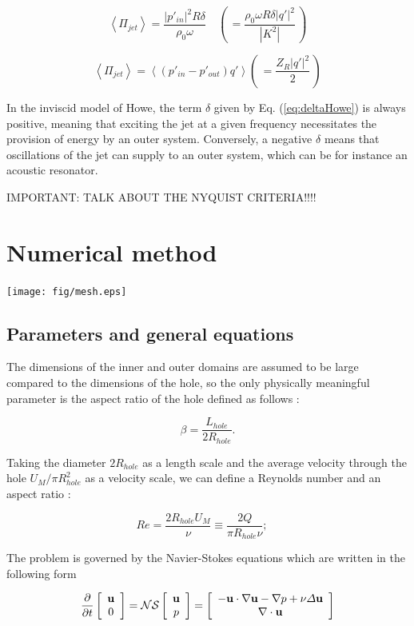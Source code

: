 \documentclass{jfm}
\newcommand\be{\begin{equation}}
\newcommand\ee{\end{equation}}
\newcommand\DP[2]{\frac{\p #1}{\p #2}}
\begin{document}
\be
\left< \Pi_{jet} \right>  = \frac{ |p'_{in}|^2 R \delta}{\rho_0 \omega} 
\quad 
\left( \, = \frac{\rho_0 \omega R \delta | q' |^2 }{|K^2|} \, \right) 
\label{eq:Pienergy}
\ee

\be
\left< \Pi_{jet} \right>  = \left< (p'_{in}-p'_{out}) q'  \right> 
\left( \, = \frac{Z_R | q' |^2 }{2} \, \right) 
\label{eq:Pienergy}
\ee

In the inviscid model of Howe, the term $\delta$ given by Eq. (\ref{eq:deltaHowe}) is always positive, meaning that 
exciting the jet at a given frequency necessitates the provision of energy by an outer system. 
Conversely, a negative $\delta$ means that oscillations of the jet can supply to an outer system, which can be for instance an acoustic resonator. 

IMPORTANT: TALK ABOUT THE NYQUIST CRITERIA!!!!





\section{Numerical method}

\texttt{[image: fig/mesh.eps]}



\subsection{Parameters and general equations}



The dimensions of the inner and outer domains are assumed to be large compared to the dimensions of the hole, so the only physically meaningful parameter is the aspect ratio of the hole defined as follows : 

$$
\beta = \frac{ L_{hole}}{2 R_{hole}}.
$$

Taking the diameter $2 R_{hole} $ as a length scale and the average velocity through the hole  $U_M/\pi R_{hole}^2$  as a velocity scale, we can define a Reynolds number and an aspect ratio :

$$ 
Re = \frac{ 2 R_{hole} U_M}{\nu} \equiv \frac{2 Q }{ \pi R_{hole} \nu} ; \quad
$$ 

The problem is governed by the Navier-Stokes equations which are written in the following form
  
\be
\DP{ }{t} \left[\begin{array}{c} {\bf u} \\ 0 \end{array} \right] = 
{\cal NS} \left[\begin{array}{c} {\bf u} \\ p \end{array} \right] =
 \left[\begin{array}{c}
- {\bf u} \cdot \nabla {\bf u} - \nabla p + \nu \Delta {\bf u} \\
 \nabla \cdot {\bf u} 
\end{array} \right] 
\label{eq:NS}
\ee 
\end{document}
